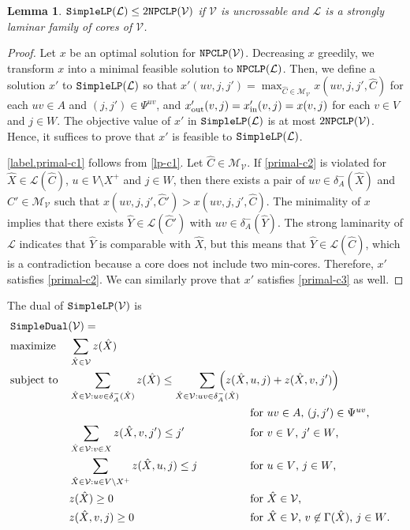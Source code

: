 \documentclass[11pt]{article}
\newtheorem{lemma}{Lemma}
\newcommand{\Mfam}{\mathcal{M}}
\newcommand{\Vfam}{\mathcal{V}}
\newcommand{\Lfam}{\mathcal{L}}
\newcommand{\NPCLP}{{\tt NPCLP}}
\newcommand{\CoreLP}{{\tt SimpleLP}}
\newcommand{\CoreDual}{{\tt SimpleDual}}
\begin{document}
\begin{lemma}\label{lem.corelpvslp}
 $\CoreLP(\Lfam) \leq 2\NPCLP(\Vfam)$ 
 if $\Vfam$ is uncrossable and $\Lfam$ is a strongly laminar family of
 cores of $\Vfam$.
 \end{lemma}
 \begin{proof}
  Let $x$ be an optimal solution for $\NPCLP(\Vfam)$.
  Decreasing $x$ greedily,
  we transform $x$ into a minimal feasible solution to $\NPCLP(\Lfam)$.
  Then, we define a solution $x'$ to $\CoreLP(\Lfam)$
  so that $x'(uv,j,j')=\max_{\hat{C} \in \Mfam_{\Vfam}}x(uv,j,j',\hat{C})$ for each $uv \in A$ and
  $(j,j')\in \Psi^{uv}$, and
  $x'_{\rm out}(v,j)=x'_{\rm in}(v,j)=x(v,j)$ for each $v \in V$ and
  $j\in W$. The objective value of $x'$ in $\CoreLP(\Lfam)$
  is at most $2\NPCLP(\Vfam)$.
  Hence, it suffices to prove that $x'$ is feasible to $\CoreLP(\Lfam)$.

  \eqref{label.primal-c1} follows from \eqref{lp-c1}.
  Let $\hat{C} \in \Mfam_{\Vfam}$.
  If \eqref{primal-c2} is violated for $\hat{X} \in \Lfam(\hat{C})$, $u \in
  V\setminus X^+$ and $j\in W$,
  then there exists a pair of $uv \in \delta^-_A(\hat{X})$
  and $\hat{C}' \in \Mfam_{\Vfam}$ such that 
  $x(uv,j,j',\hat{C}') > x(uv,j,j',\hat{C})$.
  The minimality of $x$ implies that 
  there exists $\hat{Y} \in \Lfam(\hat{C}')$
  with $uv \in \delta^-_A(\hat{Y})$.
  The strong laminarity of $\Lfam$ indicates that 
  $\hat{Y}$ is comparable with $\hat{X}$, but this 
  means that $\hat{Y} \in \Lfam(\hat{C})$, which is a contradiction
  because 
  a core does not include two min-cores.
  Therefore, $x'$ satisfies \eqref{primal-c2}.
  We can similarly prove that $x'$ satisfies \eqref{primal-c3} as well.
 \end{proof}


The dual of $\CoreLP(\Vfam)$ is 
\begin{align}
&\CoreDual(\Vfam)= \hspace*{-5em} \notag \\
 &\mbox{maximize}&&\sum_{\hat{X} \in \Vfam}z(\hat{X})\notag\\
 &\mbox{subject to} &&
 \sum_{\hat{X} \in \Vfam: uv \in \delta^-_{A}(\hat{X})} 
 z(\hat{X}) 
 \leq 
\sum_{\hat{X}\in \Vfam: uv \in \delta^-_{A}(\hat{X})}
&&\hspace*{-3em}\left(z(\hat{X},u,j) + z(\hat{X},v,j')\right) \notag\\
&&&&&\mbox{for $uv\in A$, $(j,j') \in \Psi^{uv}$,}\label{dual-c1}\\
&&& \sum_{\hat{X}\in \Vfam:v \in X}z(\hat{X},v,j') \leq j'
&&\mbox{for $v\in V$, $j' \in W$,}\label{dual-c3}\\
&&& \sum_{\hat{X}\in \Vfam:u \in V \setminus X^+}z(\hat{X},u,j) 
\leq j
&&\mbox{for $u\in V$, $j \in W$,}\label{dual-c3'}\\
 &&& z(\hat{X})\geq 0 
&&\mbox{for $\hat{X}\in \Vfam$,}\notag\\
 &&& z(\hat{X},v,j)\geq 0 
&&\mbox{for $\hat{X}\in \Vfam$, $v \not\in \Gamma(\hat{X})$, $j \in W$.}\notag
 \end{align}
\end{document}
